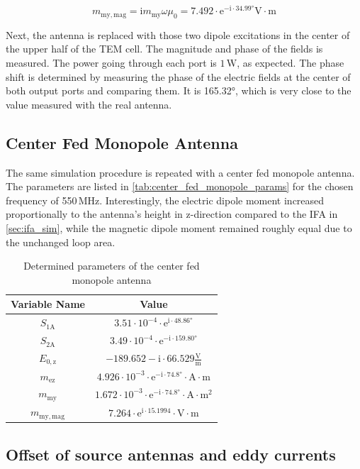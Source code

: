 \begin{equation}
    m_{\mathrm{my,mag}}=\mathrm{i}m_{\mathrm{my}}\omega\mu_0=7.492\cdot\mathrm{e}^{-\mathrm{i}\cdot34.99°}\mathrm{V\cdot m}
    \label{eqn:m_mymag_ifa}
\end{equation}

Next, the antenna is replaced with those two dipole excitations in the center of the upper half of the TEM cell. The magnitude and phase of the fields is measured. The power going through each port is $1\,\mathrm{W}$, as expected. The phase shift is determined by measuring the phase of the electric fields at the center of both output ports and comparing them. It is 165.32°, which is very close to the value measured with the real antenna.

\subsection{Center Fed Monopole Antenna}

The same simulation procedure is repeated with a center fed monopole antenna. The parameters are listed in \autoref{tab:center_fed_monopole_params} for the chosen frequency of 550\,MHz. Interestingly, the electric dipole moment increased proportionally to the antenna's height in z-direction compared to the IFA in \autoref{sec:ifa_sim}, while the magnetic dipole moment remained roughly equal due to the unchanged loop area.


\begin{table}[h]
    \centering
    \begin{tabular}{|c|c|}
        \hline
        Variable Name & Value\\\hline\hline
        $S_{1\mathrm{A}}$ & $3.51\cdot10^{-4}\cdot \mathrm{e}^{\mathrm{i}\cdot 48.86°}$\\\hline
         $S_{2\mathrm{A}}$&$3.49\cdot10^{-4}\cdot\mathrm{e}^{-\mathrm{i}\cdot 159.80°}$ \\\hline
         $E_{0,\mathrm{z}}$&$-189.652 -\mathrm{i}\cdot66.529\mathrm{\frac{V}{m}}$ \\\hline
         $m_{\mathrm{ez}}$&$4.926\cdot10^{-3}\cdot\mathrm{e}^{-\mathrm{i}\cdot74.8°}\cdot\mathrm{A\cdot m}$ \\\hline
         $m_{\mathrm{my}}$&$1.672\cdot10^{-3}\cdot\mathrm{e}^{-\mathrm{i}\cdot 74.8°}\cdot\mathrm{A\cdot m^2}$ \\\hline
         $m_{\mathrm{my,mag}}$&$7.264\cdot\mathrm{e}^{\mathrm{i}\cdot15.1994}\cdot\mathrm{V\cdot m}$ \\\hline
    \end{tabular}
    \caption{Determined parameters of the center fed monopole antenna}
    \label{tab:center_fed_monopole_params} 
\end{table}

\subsection{Offset of source antennas and eddy currents}
